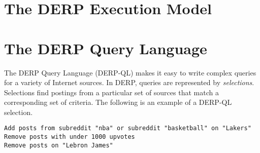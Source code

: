 \documentclass{article}
\begin{document}
\newpage
\section{\textbf{The DERP Execution Model}}




\newpage
\section{\textbf{The DERP Query Language}}
The DERP Query Language (DERP-QL) makes it easy to write complex queries for a variety of Internet sources. In DERP, queries are represented by \textit{selections}. Selections find postings from a particular set of sources that match a corresponding set of criteria. The following is an example of a DERP-QL selection.

\begin{lstlisting}
Add posts from subreddit "nba" or subreddit "basketball" on "Lakers"
Remove posts with under 1000 upvotes
Remove posts on "Lebron James"
\end{lstlisting}






\end{document}
